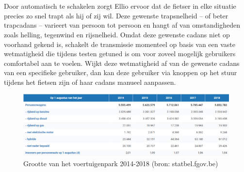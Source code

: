 \\\\
Door automatisch te schakelen zorgt Ellio ervoor dat de fietser in elke situatie precies zo snel trapt als hij of zij wil. Deze gewenste trapsnelheid – of beter trapcadans – varieert van persoon tot persoon en hangt af van omstandigheden zoals helling, tegenwind en rijsnelheid. Omdat deze gewenste cadans niet op voorhand gekend is, schakelt de transmissie momenteel op basis van een vaste wetmatigheid die tijdens testen getuned is om voor zoveel mogelijk gebruikers comfortabel aan te voelen. Wijkt deze wetmatigheid af van de gewenste cadans van een specifieke gebruiker, dan kan deze gebruiker via knoppen op het stuur tijdens het fietsen zijn of haar cadans manueel aanpassen.
\\
\begin{figure}
  \includegraphics[width=\linewidth]{images/wagenpark_belgie.png}
  \caption{Grootte van het voertuigenpark 2014-2018 (bron: statbel.fgov.be)}
  \label{fig:wagenpark}
\end{figure}


